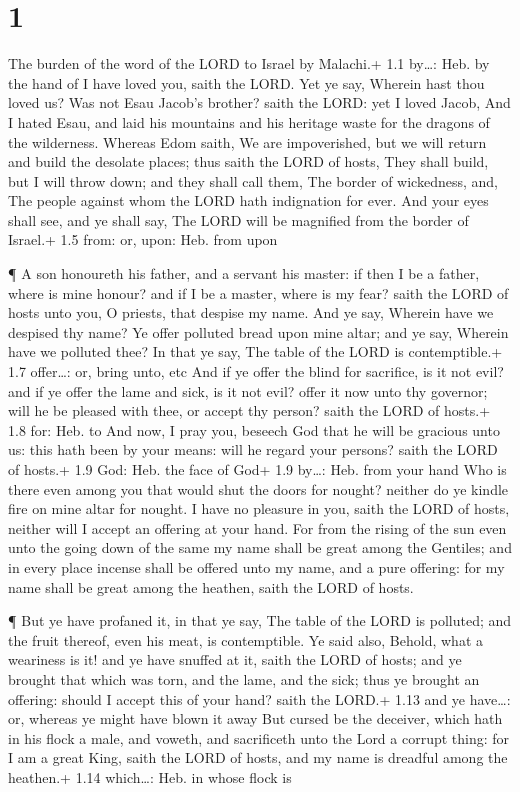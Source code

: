\hypertarget{section}{%
\section{1}\label{section}}

 The burden of the word of the LORD to Israel by Malachi.+
1.1 by\ldots: Heb. by the hand of  I have loved you, saith
the LORD. Yet ye say, Wherein hast thou loved us? Was not Esau Jacob's
brother? saith the LORD: yet I loved Jacob,  And I hated
Esau, and laid his mountains and his heritage waste for the dragons of
the wilderness.  Whereas Edom saith, We are impoverished,
but we will return and build the desolate places; thus saith the LORD of
hosts, They shall build, but I will throw down; and they shall call
them, The border of wickedness, and, The people against whom the LORD
hath indignation for ever.  And your eyes shall see, and ye
shall say, The LORD will be magnified from the border of Israel.+ 1.5
from: or, upon: Heb. from upon

 ¶ A son honoureth his father, and a servant his master: if
then I be a father, where is mine honour? and if I be a master, where is
my fear? saith the LORD of hosts unto you, O priests, that despise my
name. And ye say, Wherein have we despised thy name?  Ye
offer polluted bread upon mine altar; and ye say, Wherein have we
polluted thee? In that ye say, The table of the LORD is contemptible.+
1.7 offer\ldots: or, bring unto, etc  And if ye offer the
blind for sacrifice, is it not evil? and if ye offer the lame and sick,
is it not evil? offer it now unto thy governor; will he be pleased with
thee, or accept thy person? saith the LORD of hosts.+ 1.8 for: Heb. to
 And now, I pray you, beseech God that he will be gracious
unto us: this hath been by your means: will he regard your persons?
saith the LORD of hosts.+ 1.9 God: Heb. the face of God+ 1.9 by\ldots:
Heb. from your hand  Who is there even among you that would
shut the doors for nought? neither do ye kindle fire on mine altar for
nought. I have no pleasure in you, saith the LORD of hosts, neither will
I accept an offering at your hand.  For from the rising of
the sun even unto the going down of the same my name shall be great
among the Gentiles; and in every place incense shall be offered unto my
name, and a pure offering: for my name shall be great among the heathen,
saith the LORD of hosts.

 ¶ But ye have profaned it, in that ye say, The table of
the LORD is polluted; and the fruit thereof, even his meat, is
contemptible.  Ye said also, Behold, what a weariness is
it! and ye have snuffed at it, saith the LORD of hosts; and ye brought
that which was torn, and the lame, and the sick; thus ye brought an
offering: should I accept this of your hand? saith the LORD.+ 1.13 and
ye have\ldots: or, whereas ye might have blown it away  But
cursed be the deceiver, which hath in his flock a male, and voweth, and
sacrificeth unto the Lord a corrupt thing: for I am a great King, saith
the LORD of hosts, and my name is dreadful among the heathen.+ 1.14
which\ldots: Heb. in whose flock is

